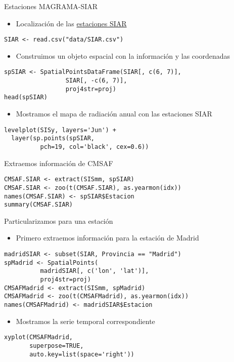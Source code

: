 \documentclass[xcolor={usenames,svgnames,dvipsnames}]{beamer}
\begin{document}
\begin{frame}[fragile,label=sec-4-1]{Estaciones MAGRAMA-SIAR}
 \begin{itemize}
\item Localización de las \href{https://raw.github.com/oscarperpinan/intro/master/data/SIAR.csv}{estaciones SIAR}
\end{itemize}
\lstset{language=R,numbers=none}
\begin{lstlisting}
SIAR <- read.csv("data/SIAR.csv")
\end{lstlisting}
\begin{itemize}
\item Construimos un objeto espacial con la información y las coordenadas
\end{itemize}
\lstset{language=R,numbers=none}
\begin{lstlisting}
spSIAR <- SpatialPointsDataFrame(SIAR[, c(6, 7)],
				 SIAR[, -c(6, 7)],
				 proj4str=proj)
head(spSIAR)
\end{lstlisting}
\begin{itemize}
\item Mostramos el mapa de radiación anual con las estaciones SIAR
\end{itemize}
\lstset{language=R,numbers=none}
\begin{lstlisting}
levelplot(SISy, layers='Jun') +
  layer(sp.points(spSIAR,
		  pch=19, col='black', cex=0.6))
\end{lstlisting}
\end{frame}
\begin{frame}[fragile,label=sec-4-2]{Extraemos información de CMSAF}
 \lstset{language=R,numbers=none}
\begin{lstlisting}
CMSAF.SIAR <- extract(SISmm, spSIAR)
CMSAF.SIAR <- zoo(t(CMSAF.SIAR), as.yearmon(idx))
names(CMSAF.SIAR) <- spSIAR$Estacion
summary(CMSAF.SIAR)
\end{lstlisting}
\end{frame}
\begin{frame}[fragile,label=sec-4-3]{Particularizamos para una estación}
 \begin{itemize}
\item Primero extraemos información para la estación de Madrid
\end{itemize}
\lstset{language=R,numbers=none}
\begin{lstlisting}
madridSIAR <- subset(SIAR, Provincia == "Madrid")
spMadrid <- SpatialPoints(
	      madridSIAR[, c('lon', 'lat')],
	      proj4str=proj)
CMSAFMadrid <- extract(SISmm, spMadrid)
CMSAFMadrid <- zoo(t(CMSAFMadrid), as.yearmon(idx))
names(CMSAFMadrid) <- madridSIAR$Estacion
\end{lstlisting}
\begin{itemize}
\item Mostramos la serie temporal correspondiente
\end{itemize}
\lstset{language=R,numbers=none}
\begin{lstlisting}
xyplot(CMSAFMadrid,
       superpose=TRUE,
       auto.key=list(space='right'))
\end{lstlisting}
\end{frame}
\end{document}

